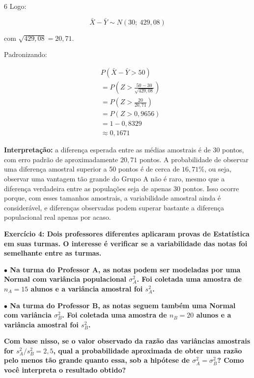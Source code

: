 \documentclass[8pt, a4paper, landscape]{extarticle}
\begin{document}
\begin{multicols}{6}
Logo:

\begin{equation*}
\bar{X} - \bar{Y} \sim N(30;\ 429,08)
\end{equation*}

com $\sqrt{429,08} = 20,71$.

Padronizando:

\begin{equation*}
\begin{split}
&P\left(\bar{X} - \bar{Y} > 50\right) \\
&= P\left(Z > \frac{50 - 30}{\sqrt{429,08}}\right) \\
&= P\left(Z > \frac{20}{20,71}\right) \\
&= P(Z > 0,9656) \\
&= 1 - 0,8329 \\
&\approx 0,1671
\end{split}
\end{equation*}

\textbf{Interpretação:} a diferença esperada entre as médias amostrais é de 30 pontos, com erro padrão de aproximadamente $20,71$ pontos. A probabilidade de observar uma diferença amostral superior a 50 pontos é de cerca de $16,71\%$, ou seja, observar uma vantagem tão grande do Grupo A não é raro, mesmo que a diferença verdadeira entre as populações seja de apenas 30 pontos. Isso ocorre porque, com esses tamanhos amostrais, a variabilidade amostral ainda é considerável, e diferenças observadas podem superar bastante a diferença populacional real apenas por acaso.

\textbf{Exercício 4: Dois professores diferentes aplicaram provas de Estatística em suas turmas. O interesse é verificar se a variabilidade das notas foi semelhante entre as turmas.}

\textbf{$\bullet$ Na turma do Professor A, as notas podem ser modeladas por uma Normal com variância populacional $\sigma_A^2$. Foi coletada uma amostra de $n_A = 15$ alunos e a variância amostral foi $s_A^2$.}

\textbf{$\bullet$ Na turma do Professor B, as notas seguem também uma Normal com variância $\sigma_B^2$. Foi coletada uma amostra de $n_B = 20$ alunos e a variância amostral foi $s_B^2$.}

\textbf{Com base nisso, se o valor observado da razão das variâncias amostrais for $s_A^2/s_B^2 = 2,5$, qual a probabilidade aproximada de obter uma razão pelo menos tão grande quanto essa, sob a hipótese de $\sigma_A^2 = \sigma_B^2$? Como você interpreta o resultado obtido?}


\end{multicols}
\end{document}
